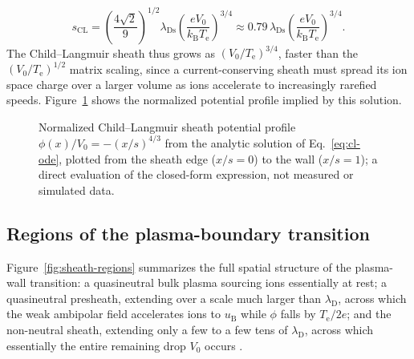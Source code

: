 \begin{equation}
s_{\mathrm{CL}} = \left( \frac{4\sqrt{2}}{9} \right)^{1/2} \lambda_{\mathrm{Ds}} \left( \frac{e V_{0}}{k_{\mathrm{B}} T_{\mathrm{e}}} \right)^{3/4} \approx 0.79\, \lambda_{\mathrm{Ds}} \left( \frac{e V_{0}}{k_{\mathrm{B}} T_{\mathrm{e}}} \right)^{3/4}.
\label{eq:cl-thickness}
\end{equation}
The Child--Langmuir sheath thus grows as $(V_{0}/T_{\mathrm{e}})^{3/4}$, faster than the $(V_{0}/T_{\mathrm{e}})^{1/2}$ matrix scaling, since a current-conserving sheath must spread its ion space charge over a larger volume as ions accelerate to increasingly rarefied speeds. Figure~\ref{fig:child-langmuir-profile} shows the normalized potential profile implied by this solution.

\begin{figure}[htbp]
\centering
{}
\caption{Normalized Child--Langmuir sheath potential profile $\phi(x)/V_{0} = -(x/s)^{4/3}$ from the analytic solution of Eq.~\eqref{eq:cl-ode}, plotted from the sheath edge ($x/s=0$) to the wall ($x/s=1$); a direct evaluation of the closed-form expression, not measured or simulated data.}
\label{fig:child-langmuir-profile}
\end{figure}

\subsection{Regions of the plasma-boundary transition}

Figure~\ref{fig:sheath-regions} summarizes the full spatial structure of the plasma-wall transition: a quasineutral bulk plasma sourcing ions essentially at rest; a quasineutral presheath, extending over a scale much larger than $\lambda_{\mathrm{D}}$, across which the weak ambipolar field accelerates ions to $u_{\mathrm{B}}$ while $\phi$ falls by $T_{\mathrm{e}}/2e$; and the non-neutral sheath, extending only a few to a few tens of $\lambda_{\mathrm{D}}$, across which essentially the entire remaining drop $V_{0}$ occurs \cite{ref0013,ref0023}.

